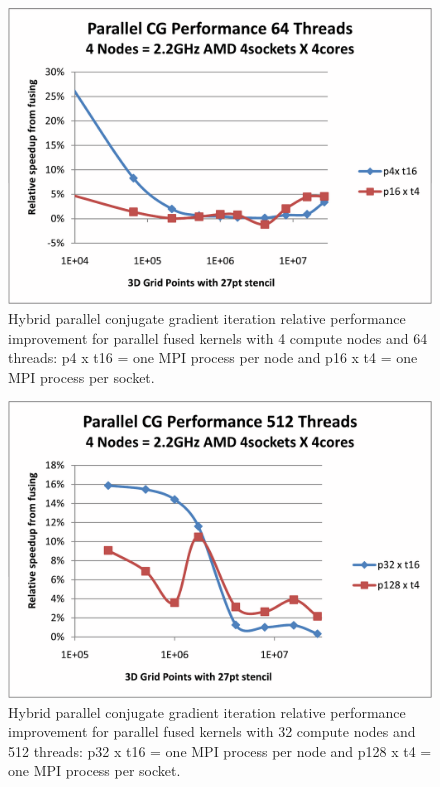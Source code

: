 \begin{figure}[h]
\center
\includegraphics[viewport=1in 0.5in 8.5in 7in,angle=0,scale=0.5]{figures/test-hhpccg-intel-11-1-mpi-exe-np4-no-overlap-fusing}
\caption{Hybrid parallel conjugate gradient iteration relative performance improvement for parallel fused kernels with 4 compute nodes and 64 threads: p4 x t16 = one MPI process per node and p16 x t4 = one MPI process per socket.}
\label{fig:CGPerf:np4:fusing}
\end{figure}

\begin{figure}[h]
\center
\includegraphics[viewport=1in 0.5in 8.5in 7in,angle=0,scale=0.5]{figures/test-hhpccg-intel-11-1-mpi-exe-np32-no-overlap-fusing}
\caption{Hybrid parallel conjugate gradient iteration relative performance improvement for parallel fused kernels with 32 compute nodes and 512 threads: p32 x t16 = one MPI process per node and p128 x t4 = one MPI process per socket.}
\label{fig:CGPerf:np32:fusing}
\end{figure}
















